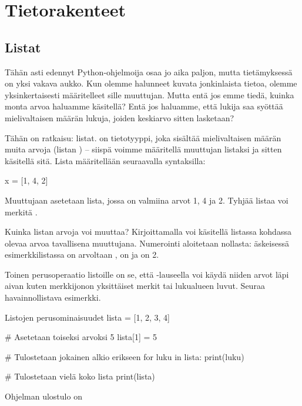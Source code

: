 \chapter{Tietorakenteet}

\section{Listat}

Tähän asti edennyt Python-ohjelmoija osaa jo aika paljon, mutta tietämyksessä on yksi vakava aukko. Kun olemme halunneet kuvata jonkinlaista tietoa, olemme yksinkertaisesti määritelleet sille muuttujan. Mutta entä jos emme tiedä, kuinka monta arvoa haluamme käsitellä? Entä jos haluamme, että lukija saa syöttää mielivaltaisen määrän lukuja, joiden keskiarvo sitten lasketaan?

Tähän on ratkaisu: listat.  on tietotyyppi, joka sisältää mielivaltaisen määrän muita arvoja (listan ) -- siispä voimme määritellä muuttujan listaksi ja sitten käsitellä sitä. Lista määritellään seuraavalla syntaksilla:

\begin{python}
x = [1, 4, 2]
\end{python}

Muuttujaan  asetetaan lista, jossa on valmiina arvot 1, 4 ja 2. Tyhjää listaa voi merkitä \code{[]}.

Kuinka listan arvoja voi muuttaa? Kirjoittamalla  voi käsitellä listassa  kohdassa  olevaa arvoa tavallisena muuttujana. Numerointi aloitetaan nollasta: äskeisessä esimerkkilistassa  on arvoltaan ,  on  ja  on 2.

Toinen perusoperaatio listoille on se, että -lauseella voi käydä niiden arvot läpi aivan kuten merkkijonon yksittäiset merkit tai lukualueen luvut. Seuraa havainnollistava esimerkki.

\begin{example}{Listojen perusominaisuudet}
lista = [1, 2, 3, 4]

# Asetetaan toiseksi arvoksi 5
lista[1] = 5

# Tulostetaan jokainen alkio erikseen
for luku in lista:
	print(luku)

# Tulostetaan vielä koko lista
print(lista)
\end{example}

Ohjelman ulostulo on

